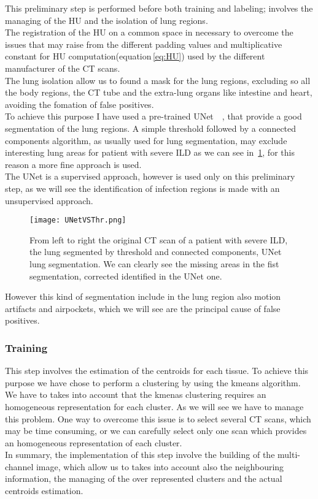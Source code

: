 \documentclass{standalone}
\begin{document}
	This preliminary step is performed before both training and labeling; involves the managing of the HU and the isolation of lung regions.\\
	The registration of the HU on a common space in necessary to overcome the issues that may raise from the different padding values and multiplicative constant for HU computation(equation\,\ref{eq:HU}) used by the different manufacturer of the CT scans.\\
	The lung isolation allow us to found a mask for the lung regions, excluding so all the body regions, the CT tube and the extra-lung organs like intestine and heart, avoiding the fomation of false positives.\\
	To achieve this purpose I have used a pre-trained UNet~\cite{ART:Johannes}~\cite{REP:lungmask}, that provide a good segmentation of the lung regions. 
	A simple threshold followed by a connected components algorithm, as usually used for lung segmentation, may exclude interesting lung areas for patient with severe ILD as we can see in \figurename\,\ref{fig:UNetVSThr}, for this reason a more fine approach is used.\\
	The UNet is a supervised approach, however is used only on this preliminary step, as we will see the identification of infection regions is made with an unsupervised approach.\\
	
	\begin{figure}[h!]
		\centering
		\texttt{[image: UNetVSThr.png]}
		\caption{From left to right the original CT scan of a patient with severe ILD, the lung segmented by threshold and connected components, UNet lung segmentation. We can clearly see the missing areas in the fist segmentation, corrected identified in the UNet one.}\label{fig:UNetVSThr}
		
	\end{figure}
	
	However this kind of segmentation include in the lung region also motion artifacts and airpockets, which we will see are the principal cause of false positives.
	
	\subsubsection*{Training}
	
	This step involves the estimation of the centroids for each tissue. To achieve this purpose we have chose to perform a clustering by using the kmeans algorithm. We have to takes into account that the kmenas clustering requires an homogeneous representation for each cluster. As we will see we have to manage this problem. One way to overcome this issue is to select several CT scans, which may be time consuming, or we can carefully select only one scan which provides an homogeneous representation of each cluster.\\
	In summary, the implementation of this step involve the building of the multi-channel image, which allow us to takes into account also the neighbouring information, the managing of the over represented clusters  and the actual centroids estimation.
\end{document}
